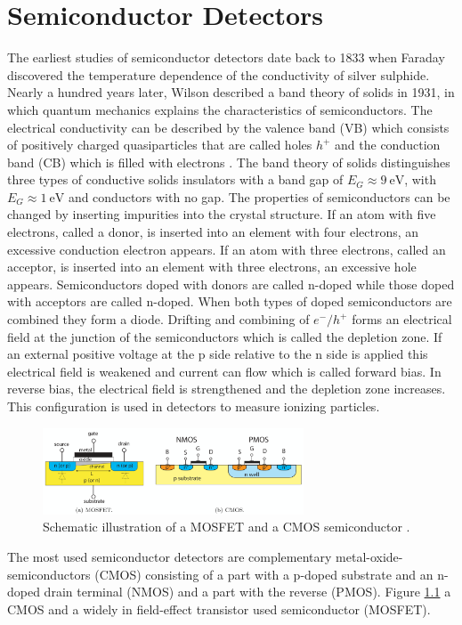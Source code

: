 \chapter{Semiconductor Detectors}\label{Semiconductors}

The earliest studies of semiconductor detectors date back to 1833 when Faraday discovered the temperature dependence of the conductivity of silver sulphide.
Nearly a hundred years later, Wilson described a band theory of solids in 1931, in which quantum mechanics explains the characteristics of semiconductors.
The electrical conductivity can be described by the valence band (VB) which consists of positively charged quasiparticles that are called holes $h^+$ and the conduction band (CB) which is filled with electrons \cite{KolanoskiWermes}.
The band theory of solids distinguishes three types of conductive solids insulators with a band gap of $E_G\approx \SI{9}{\eV}$, with $E_G\approx \SI{1}{\eV}$ and conductors with no gap.
The properties of semiconductors can be changed by inserting impurities into the crystal structure.
If an atom with five electrons, called a donor, is inserted into an element with four electrons, an excessive conduction electron appears.
If an atom with three electrons, called an acceptor, is inserted into an element with three electrons, an excessive hole appears.
Semiconductors doped with donors are called n-doped while those doped with acceptors are called n-doped.
When both types of doped semiconductors are combined they form a diode.
Drifting and combining of $e^-/h^+$ forms an electrical field at the junction of the semiconductors which is called the depletion zone.
If an external positive voltage at the p side relative to the n side is applied this electrical field is weakened and current can flow which is called forward bias.
In reverse bias, the electrical field is strengthened and the depletion zone increases. 
This configuration is used in detectors to measure ionizing particles.
\begin{figure}[H]
    \centering
    \includegraphics[width=0.69\textwidth]{figs/MOS.png}
    \caption{Schematic illustration of a MOSFET and a CMOS semiconductor \cite{KolanoskiWermes}.}
    \label{fig:MOStransition}
\end{figure}
The most used semiconductor detectors are complementary metal-oxide-semiconductors (CMOS) consisting of a part with a p-doped substrate and an n-doped drain terminal (NMOS) and a part with the reverse (PMOS).
Figure \ref{fig:MOStransition} a CMOS and a widely in field-effect transistor used semiconductor (MOSFET).

